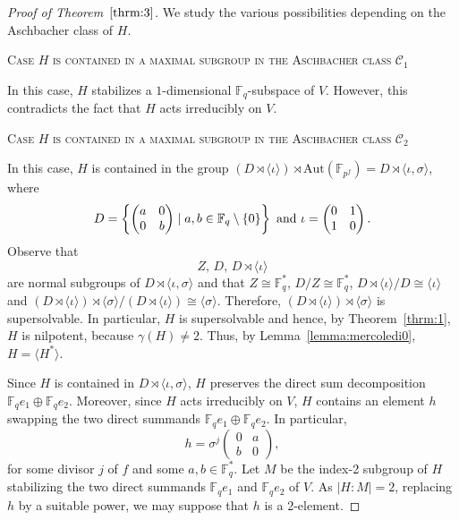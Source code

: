 \documentclass{amsart}
\begin{document}
\begin{proof}[Proof of Theorem~$\ref{thrm:3}$]

We study the various possibilities depending on the Aschbacher class of $H$.

\smallskip

\noindent\textsc{Case $H$ is contained in a maximal subgroup in the Aschbacher class $\mathcal{C}_1$} 

\smallskip

\noindent In this case, $H$ stabilizes a $1$-dimensional $\mathbb{F}_q$-subspace  of $V$. However, this contradicts the fact that $H$ acts irreducibly on $V$.


\smallskip

\noindent\textsc{Case $H$ is contained in a maximal subgroup in the Aschbacher class $\mathcal{C}_2$} 

\smallskip

\noindent In this case, $H$ is contained in the group $(D\rtimes\langle\iota\rangle)\rtimes\mathrm{Aut}(\mathbb{F}_{p^f})=D\rtimes\langle\iota,\sigma\rangle$, where
$$D=
\left\{
\begin{pmatrix}
a&0\\
0&b
\end{pmatrix}
\mid a,b\in \mathbb{F}_q\setminus\{0\}
\right\} \hbox{ and }
\iota=
\begin{pmatrix}
0&1\\
1&0
\end{pmatrix}.$$
Observe that $$Z,\,D,\,D\rtimes\langle\iota\rangle$$
are normal subgroups of $D\rtimes\langle\iota,\sigma\rangle$ and that $Z\cong\mathbb{F}_q^\ast$, $D/Z\cong\mathbb{F}_q^\ast$, $D\rtimes\langle\iota\rangle/D\cong\langle\iota\rangle$
 and $(D\rtimes\langle\iota\rangle)\rtimes\langle\sigma\rangle/(D\rtimes\langle\iota\rangle)\cong\langle\sigma\rangle$. Therefore, $(D\rtimes\langle\iota\rangle)\rtimes\langle\sigma\rangle$ is supersolvable. In particular, $H$ is supersolvable and hence, by Theorem~\ref{thrm:1}, $H$ is nilpotent, because $\gamma(H)\ne 2$. Thus, by Lemma~\ref{lemma:mercoledi0}, $H=\langle H^\ast\rangle$.

Since $H$ is contained in $D\rtimes\langle\iota,\sigma\rangle$, $H$ preserves the direct sum decomposition $\mathbb{F}_qe_1\oplus\mathbb{F}_qe_2$. Moreover, since $H$ acts irreducibly on $V$, $H$ contains an element $h$ swapping the two direct summands $\mathbb{F}_qe_1\oplus\mathbb{F}_qe_2$. In particular,
$$h=\sigma^j
\begin{pmatrix}
0&a\\
b&0\end{pmatrix},$$
for some divisor $j$ of $f$ and some $a,b\in\mathbb{F}_q^\ast$. Let $M$ be the index-2 subgroup of $H$ stabilizing the two direct summands $\mathbb{F}_qe_1$ and $\mathbb{F}_qe_2$ of $V$. As $|H:M|=2$, replacing $h$ by a suitable power, we may suppose that $h$ is a $2$-element.


\end{proof}
\end{document}
